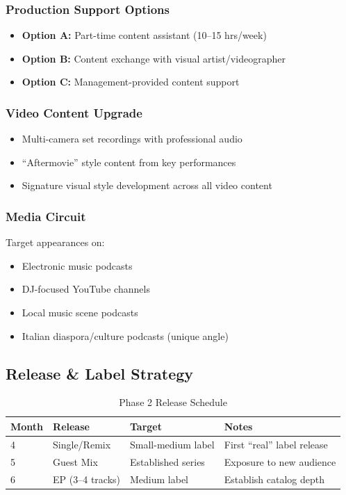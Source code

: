 \documentclass[11pt,a4paper]{article}
\begin{document}
\subsubsection{Production Support Options}
\begin{itemize}[leftmargin=*]
    \item \textbf{Option A:} Part-time content assistant (10--15 hrs/week)
    \item \textbf{Option B:} Content exchange with visual artist/videographer
    \item \textbf{Option C:} Management-provided content support
\end{itemize}

\subsubsection{Video Content Upgrade}
\begin{itemize}[leftmargin=*]
    \item Multi-camera set recordings with professional audio
    \item ``Aftermovie'' style content from key performances
    \item Signature visual style development across all video content
\end{itemize}

\subsubsection{Media Circuit}
Target appearances on:
\begin{itemize}[leftmargin=*]
    \item Electronic music podcasts
    \item DJ-focused YouTube channels
    \item Local music scene podcasts
    \item Italian diaspora/culture podcasts (unique angle)
\end{itemize}

\subsection{Release \& Label Strategy}

\begin{table}[h!]
\centering
\renewcommand{\arraystretch}{1.3}
\begin{tabularx}{\textwidth}{l l l X}
\toprule
\rowcolor{amaraprimary}
\textcolor{amaracream}{\textbf{Month}} & \textcolor{amaracream}{\textbf{Release}} & \textcolor{amaracream}{\textbf{Target}} & \textcolor{amaracream}{\textbf{Notes}} \\
\midrule
4 & Single/Remix & Small-medium label & First ``real'' label release \\
5 & Guest Mix & Established series & Exposure to new audience \\
6 & EP (3--4 tracks) & Medium label & Establish catalog depth \\
\bottomrule
\end{tabularx}
\caption{Phase 2 Release Schedule}
\end{table}
\end{document}
